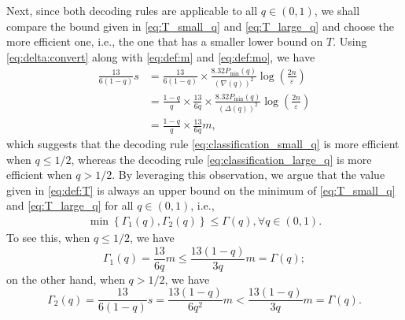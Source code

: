 \documentclass[onecolumn,letterpaper]{IEEEtran}
\newcommand{\cp}{{q}}
\newcommand{\nt}{{m}}
\newcommand{\mo}{{s}}
\newcommand{\pmin}{{P_{\min}(\cp)}}
\newcommand{\pgap}{{\Delta(\cp)}}
\newcommand{\pgapm}{{\nabla(\cp)}}
\newcommand{\ftau}{{\Gamma}}
\newcommand{\fT}{{\ftau(\cp)}}
\newcommand{\fTo}{\ftau_1(\cp)}
\newcommand{\fTt}{\ftau_2(\cp)}
\begin{document}
Next, since both decoding rules are applicable to all $\cp \in (0,1)$, we shall compare the bound given in \eqref{eq:T_small_q} and \eqref{eq:T_large_q} and choose the more efficient one, i.e., the one that has a smaller lower bound on $T$.
Using \eqref{eq:delta:convert} along with \eqref{eq:def:m} and \eqref{eq:def:mo}, we have 
\begin{equation*} 
\label{eq:s_m}
\begin{aligned}
    \frac{13}{6(1-\cp)} \mo &= \frac{13}{6(1-\cp)} \times \frac{8.32\pmin}{(\pgapm)^2} \log \left( \frac{2n}{\varepsilon} \right) \\
    &= \frac{1-\cp}{\cp} \times \frac{13}{6\cp} \times \frac{8.32\pmin}{(\pgap)^2} \log \left( \frac{2n}{\varepsilon} \right) \\
    &= \frac{1-\cp}{\cp} \times \frac{13}{6\cp}\nt, 
\end{aligned}
\end{equation*}
which suggests that the decoding rule \eqref{eq:classification_small_q} is more efficient when $\cp \leq 1/2$, whereas the decoding rule \eqref{eq:classification_large_q} is more efficient when $\cp > 1/2$. 
By leveraging this observation, we argue that the value given in \eqref{eq:def:T} is always an upper bound on the minimum of  \eqref{eq:T_small_q} and \eqref{eq:T_large_q} for all $\cp \in (0,1)$, i.e.,
\begin{align*}
   \min\left\{ \fTo , \fTt \right\} \le \fT ,  \forall \cp \in (0,1).
\end{align*}
To see this, when $\cp \le 1/2$, we have 
\begin{equation*}
    \fTo = \frac{13}{6\cp} \nt \le \frac{13(1-\cp)}{3\cp} \nt = \fT;
\end{equation*}
on the other hand, when $\cp > 1/2$, we have
\begin{equation*}
    \fTt = \frac{13}{6(1-\cp)} \mo = \frac{13(1-\cp)}{6\cp^2}\nt < \frac{13(1-\cp)}{3\cp} \nt = \fT.
\end{equation*}
\end{document}
